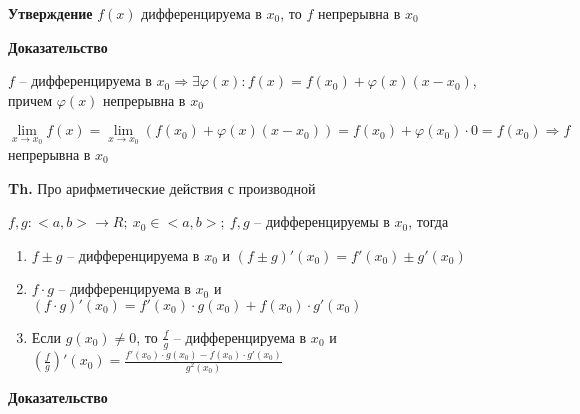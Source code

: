 \documentclass[14pt, letter paper]{article}
\begin{document}
\vspace{3mm}

\textbf{Утверждение} $f(x)$ дифференцируема в $x_0$, то $f$ непрерывна в $x_0$

\begin{center}
    \textbf{Доказательство}
\end{center}

$f$ -- дифференцируема в $x_0 \Rightarrow \exists \varphi(x) : f(x) = f(x_0) + \varphi(x)(x - x_0)$, причем $\varphi(x)$ непрерывна в $x_0$

$\lim\limits_{x \rightarrow x_0} f(x) = \lim\limits_{x \rightarrow x_0} (f(x_0) + \varphi(x)(x - x_0)) = f(x_0) + \varphi(x_0) \cdot 0 = f(x_0) \Rightarrow f$ непрерывна в $x_0$

\vspace{5mm}

\textbf{Th.} Про арифметические действия с производной

$f, g : <a, b> \rightarrow R;\ x_0 \in <a, b>;\ f, g$ -- дифференцируемы в $x_0$, тогда 

\begin{enumerate}
    \item $f \pm g$ -- дифференцируема в $x_0$ и $(f \pm g)'(x_0) = f'(x_0) \pm g'(x_0)$
    \item $f \cdot g$ -- дифференцируема в $x_0$ и $(f \cdot g)'(x_0) = f'(x_0) \cdot g(x_0) + f(x_0) \cdot g'(x_0)$
    \item Если $g(x_0) \neq 0$, то $\frac{f}{g}$ -- дифференцируема в $x_0$ и $(\frac{f}{g})'(x_0) = \frac{f'(x_0) \cdot g(x_0) - f(x_0) \cdot g'(x_0)}{g^2(x_0)}$
\end{enumerate}

\begin{center}
    \textbf{Доказательство}
\end{center}
\end{document}
